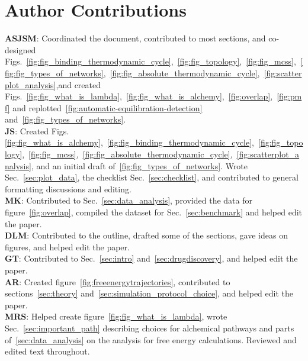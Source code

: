 \documentclass[9pt,bestpractices]{livecoms}
\begin{document}
\section*{Author Contributions}
%
\textbf{ASJSM}: Coordinated the document, contributed to most sections, and co-designed Figs.~\ref{fig:fig_binding_thermodynamic_cycle},~\ref{fig:fig_topology},~\ref{fig:fig_mcss},~\ref{fig:fig_types_of_networks},~\ref{fig:fig_absolute_thermodynamic_cycle},~\ref{fig:scatterplot_analysis},and created Figs.~\ref{fig:fig_what_is_lambda},~\ref{fig:fig_what_is_alchemy},~\ref{fig:overlap},~\ref{fig:pmf} and replotted~\ref{fig:automatic-equilibration-detection} and~\ref{fig:fig_types_of_networks}.\\
\textbf{JS}: Created Figs.~ \ref{fig:fig_what_is_alchemy},~\ref{fig:fig_binding_thermodynamic_cycle},~\ref{fig:fig_topology},~\ref{fig:fig_mcss},~\ref{fig:fig_absolute_thermodynamic_cycle},~\ref{fig:scatterplot_analysis}, and an initial draft of~\ref{fig:fig_types_of_networks}. Wrote Sec.~\ref{sec:plot_data}, the checklist Sec.~\ref{sec:checklist}, and contributed to general formatting discussions and editing.\\
\textbf{MK}: Contributed to Sec.~\ref{sec:data_analysis}, provided the data for figure~\ref{fig:overlap}, compiled the dataset for Sec.~\ref{sec:benchmark} and helped edit the paper.\\
\textbf{DLM}: Contributed to the outline, drafted some of the sections, gave ideas on figures, and helped edit the paper.\\
\textbf{GT}: Contributed to Sec.~\ref{sec:intro} and~\ref{sec:drugdiscovery}, and helped edit the paper.\\
\textbf{AR}: Created figure~\ref{fig:freeenergytrajectories}, contributed to sections~\ref{sec:theory} and~\ref{sec:simulation_protocol_choice}, and helped edit the paper.\\
\textbf{MRS}: Helped create figure~\ref{fig:fig_what_is_lambda}, wrote Sec.~\ref{sec:important_path} describing choices for alchemical pathways and parts of~\ref{sec:data_analysis} on the analysis for free energy calculations. Reviewed and edited text throughout.\\
\end{document}
